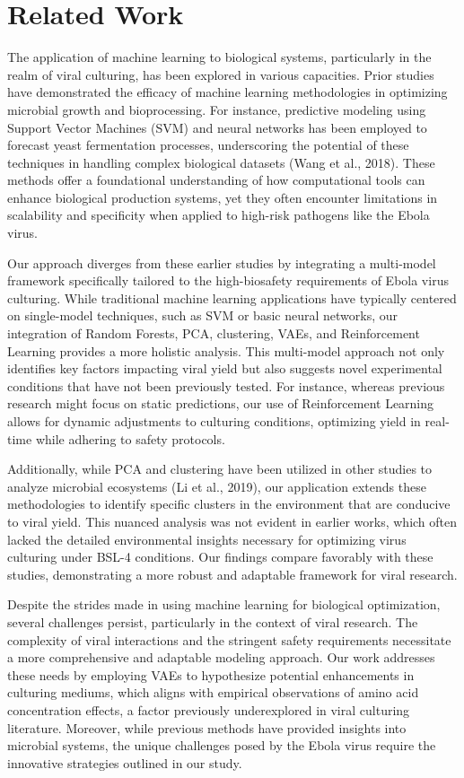\documentclass{article}
\begin{document}
\section{Related Work}
The application of machine learning to biological systems, particularly in the realm of viral culturing, has been explored in various capacities. Prior studies have demonstrated the efficacy of machine learning methodologies in optimizing microbial growth and bioprocessing. For instance, predictive modeling using Support Vector Machines (SVM) and neural networks has been employed to forecast yeast fermentation processes, underscoring the potential of these techniques in handling complex biological datasets (Wang et al., 2018). These methods offer a foundational understanding of how computational tools can enhance biological production systems, yet they often encounter limitations in scalability and specificity when applied to high-risk pathogens like the Ebola virus.

Our approach diverges from these earlier studies by integrating a multi-model framework specifically tailored to the high-biosafety requirements of Ebola virus culturing. While traditional machine learning applications have typically centered on single-model techniques, such as SVM or basic neural networks, our integration of Random Forests, PCA, clustering, VAEs, and Reinforcement Learning provides a more holistic analysis. This multi-model approach not only identifies key factors impacting viral yield but also suggests novel experimental conditions that have not been previously tested. For instance, whereas previous research might focus on static predictions, our use of Reinforcement Learning allows for dynamic adjustments to culturing conditions, optimizing yield in real-time while adhering to safety protocols.

Additionally, while PCA and clustering have been utilized in other studies to analyze microbial ecosystems (Li et al., 2019), our application extends these methodologies to identify specific clusters in the environment that are conducive to viral yield. This nuanced analysis was not evident in earlier works, which often lacked the detailed environmental insights necessary for optimizing virus culturing under BSL-4 conditions. Our findings compare favorably with these studies, demonstrating a more robust and adaptable framework for viral research.

Despite the strides made in using machine learning for biological optimization, several challenges persist, particularly in the context of viral research. The complexity of viral interactions and the stringent safety requirements necessitate a more comprehensive and adaptable modeling approach. Our work addresses these needs by employing VAEs to hypothesize potential enhancements in culturing mediums, which aligns with empirical observations of amino acid concentration effects, a factor previously underexplored in viral culturing literature. Moreover, while previous methods have provided insights into microbial systems, the unique challenges posed by the Ebola virus require the innovative strategies outlined in our study.
\end{document}

